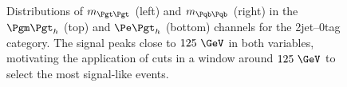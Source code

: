 \begin{figure}
\begin{center}

\end{center}
\caption{
Distributions of $m_{\Pgt\Pgt}$ (left) and $m_{\Pqb\Pqb}$ (right) in the $\mutau$ (top) and
$\etau$ (bottom) channels for the 2jet--0tag category. The signal peaks close to $125~\GeV$ in both
variables, motivating the application of cuts in a window around $125~\GeV$ to
select the most signal-like events.}
\label{fig:2jet0tagmttmbb}
\end{figure} 

